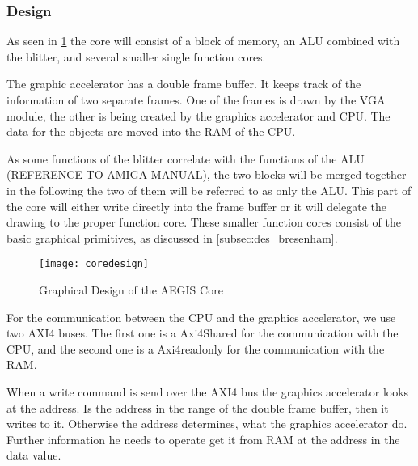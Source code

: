 \subsubsection*{Design}
As seen in \cref{img:coredes} the core will consist of a block of memory, an ALU combined with the blitter, and several smaller single function cores.

The graphic accelerator has a double frame buffer. It keeps track of the information of two separate frames. One of the frames is drawn by the VGA module, the other is being created by the graphics accelerator and CPU. The data for the objects are moved into the RAM of the CPU.

As some functions of the blitter correlate with the functions of the ALU (REFERENCE TO AMIGA MANUAL), the two blocks will be merged together in the following the two of them will be referred to as only the ALU. This part of the core will either write directly into the frame buffer or it will delegate the drawing to the proper function core. These smaller function cores consist of the basic graphical primitives, as discussed in \cref{subsec:des_bresenham}.
\begin{figure}[H]
	\centering
	\texttt{[image: coredesign]}
	\caption{Graphical Design of the AEGIS Core }
	\label{img:coredes}
\end{figure}

For the communication between the CPU and the graphics accelerator, we use two AXI4 buses. The first one is a Axi4Shared for the communication with the CPU, and the second one is a Axi4readonly for the communication with the RAM.

When a write command is send over the AXI4 bus the graphics accelerator looks at the address. Is the address in the range of the double frame buffer, then it writes to it. Otherwise the address determines, what the graphics accelerator do. Further information he needs to operate get it from RAM at the address in the data value. 

